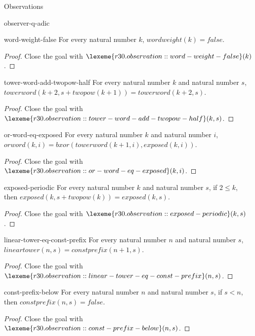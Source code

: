\begin{lexlean}{Observations}
\begin{section}{observer-q-adic}
\begin{theorem}{word-weight-false}
For every natural number \(k\), \(wordweight(k) = false\).
\begin{proof}
Close the goal with \(\lexeme{r30.observation::word-weight-false}(k)\).
\end{proof}
\end{theorem}

\begin{theorem}{tower-word-add-twopow-half}
For every natural number \(k\) and natural number \(s\), \(towerword(k + 2, s + twopow(k + 1)) = towerword(k + 2, s)\).
\begin{proof}
Close the goal with \(\lexeme{r30.observation::tower-word-add-twopow-half}(k, s)\).
\end{proof}
\end{theorem}

\begin{theorem}{or-word-eq-exposed}
For every natural number \(k\) and natural number \(i\), \(orword(k, i) = bxor(towerword(k + 1, i), exposed(k, i))\).
\begin{proof}
Close the goal with \(\lexeme{r30.observation::or-word-eq-exposed}(k, i)\).
\end{proof}
\end{theorem}

\begin{theorem}{exposed-periodic}
For every natural number \(k\) and natural number \(s\), if \(2 ≤ k\), then \(exposed(k, s + twopow(k)) = exposed(k, s)\).
\begin{proof}
Close the goal with \(\lexeme{r30.observation::exposed-periodic}(k, s)\).
\end{proof}
\end{theorem}

\begin{theorem}{linear-tower-eq-const-prefix}
For every natural number \(n\) and natural number \(s\), \(lineartower(n, s) = constprefix(n + 1, s)\).
\begin{proof}
Close the goal with \(\lexeme{r30.observation::linear-tower-eq-const-prefix}(n, s)\).
\end{proof}
\end{theorem}

\begin{theorem}{const-prefix-below}
For every natural number \(n\) and natural number \(s\), if \(s < n\), then \(constprefix(n, s) = false\).
\begin{proof}
Close the goal with \(\lexeme{r30.observation::const-prefix-below}(n, s)\).
\end{proof}
\end{theorem}


\end{section}
\end{lexlean}
